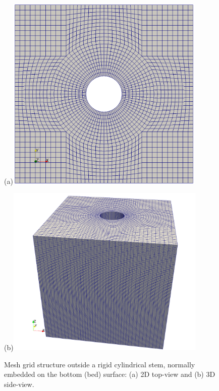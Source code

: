 \newpage\null
\vfill
\begin{figure}[H]
\begin{centering}
(a)\includegraphics[width=3.75in]{Figures/mesh-empty-cylinder-in-z2-2019-10-13-20-51-19-PM}
\par\end{centering}
\begin{centering}
(b)\includegraphics[width=3.75in]{Figures/mesh-empty-cylinder-3d2-2019-10-13-20-52-33-PM}
\par\end{centering}
\caption{\label{fig:emptyStem}Mesh grid structure outside a rigid cylindrical
stem, normally embedded on the bottom (bed) surface: (a) 2D top-view
and (b) 3D side-view.}
\end{figure}

\vfill$\phantom{.}$
